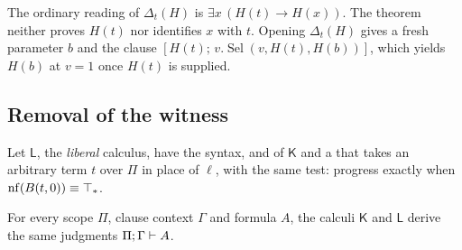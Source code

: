The ordinary reading of $\Delta_t(H)$ is $\exists x\,(H(t)\to H(x))$.  The
theorem neither proves $H(t)$ nor identifies $x$ with $t$.  Opening
$\Delta_t(H)$ gives a fresh parameter $b$ and the clause
$[H(t);\,v.\operatorname{Sel}(v,H(t),H(b))]$, which yields $H(b)$ at $v=1$
once $H(t)$ is supplied.

\subsection{Removal of the witness}

Let $\mathsf{L}$, the \emph{liberal} calculus, have the syntax,
 and  of $\mathsf{K}$ and a 
that takes an arbitrary term $t$ over $\Pi$ in place of $\ell$, with the
same test: progress exactly when $\operatorname{nf}(B(t,0))\equiv\top_{*}$.

\begin{theorem}
\label{wit:thm:witness-removal}
For every scope $\Pi$, clause context $\Gamma$ and formula $A$, the calculi
$\mathsf{K}$ and $\mathsf{L}$ derive the same judgments
$\Pi;\Gamma\vdash A$.
\end{theorem}

